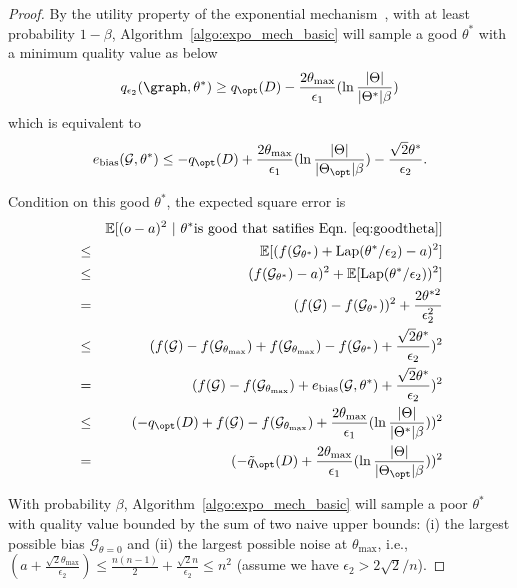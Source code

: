 \begin{proof}
By the utility property of the exponential mechanism~\cite{mcsherry2007mechanism}, with at least probability $1-\beta$, Algorithm~\ref{algo:expo_mech_basic} will sample a good $\theta^*$ with a minimum quality value as below
\begin{equation}
    q_{\epsilon_2}(\graph,\theta^*) \geq q_{\opt}(D) - \frac{2 \theta_{\max}}{\epsilon_1} (\ln \frac{|\Theta|}{|\Theta^*|\beta})
\end{equation}
which is equivalent to 
\begin{equation}\label{eq:goodtheta}
    e_{\text{bias}}(\mathcal{G},\theta^*)  \leq -q_{\opt}(D) + \frac{2 \theta_{\max}}{\epsilon_1} (\ln \frac{|\Theta|}{|\Theta_{\opt}|\beta}) -  \frac{\sqrt{2}\theta^*}{\epsilon_2}.
\end{equation}

Condition on this good $\theta^*$, the expected square error is 
\begin{eqnarray}
   && \mathbb{E}[(o-a)^2 ~|~\theta^* \text{is good that satifies Eqn.~\eqref{eq:goodtheta}}]\nonumber \\
       &\leq& 
       \mathbb{E}[(f(\mathcal{G}_{\theta^*})+\text{Lap}(\theta^*/\epsilon_2)-a)^2]
            \nonumber  \\
    &\leq& (f(\mathcal{G}_{\theta^*})-a)^2+
       \mathbb{E}[\text{Lap}(\theta^*/\epsilon_2))^2] \nonumber \\
    &=& (f(\mathcal{G})-f(\mathcal{G}_{\theta^*}))^2+
      \frac{2\theta^{*2}}{\epsilon_2^2} \nonumber \\
    &\leq& (f(\mathcal{G})-f(\mathcal{G}_{\theta_{\max}}) +
f(\mathcal{G}_{\theta_{\max}}) - f(\mathcal{G}_{\theta^*})
 +    \frac{\sqrt{2}\theta^*}{\epsilon_2})^2  \nonumber\\    
    &=& (f(\mathcal{G})-f(\mathcal{G}_{\theta_{\max}}) +
        e_{\text{bias}}(\mathcal{G},\theta^*)  + \frac{\sqrt{2}\theta^*}{\epsilon_2})^2 \nonumber\\
     &\leq& (-q_{\opt}(D) + f(\mathcal{G})-f(\mathcal{G}_{\theta_{\max}}) + \frac{2 \theta_{\max}}{\epsilon_1} (\ln \frac{|\Theta|}{|\Theta^*|\beta}))^2  \nonumber \\
      &=& (-\tilde{q}_{\opt}(D) + \frac{2 \theta_{\max}}{\epsilon_1} (\ln \frac{|\Theta|}{|\Theta_{\opt}|\beta}))^2 
\end{eqnarray}

With probability $\beta$, Algorithm~\ref{algo:expo_mech_basic} will sample a poor $\theta^*$ with quality value bounded by the sum of two naive upper bounds: (i) the largest possible bias $\mathcal{G}_{\theta=0}$ and (ii) the largest possible noise at $\theta_{\max}$, i.e., $(a+\frac{\sqrt{2}\theta_{\max}}{\epsilon_2})\leq \frac{n(n-1)}{2}+\frac{\sqrt{2}n}{\epsilon_2}\leq n^2$ (assume we have $\epsilon_2>2\sqrt{2}/n$). 


\end{proof}
